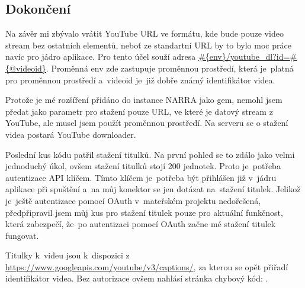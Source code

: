 \subsection{Dokončení}
\par Na závěr mi zbývalo vrátit YouTube URL ve formátu, kde bude pouze video stream bez ostatních elementů, neboť ze standartní URL by to bylo moc práce navíc pro jádro aplikace. Pro tento účel souží adresa \url{#{env}/youtube_dl?id=#{@videoid}}. Proměnná env zde zastupuje proměnnou prostředí, která je~platná pro proměnnou prostředí a~videoid je~již dobře známý identifikátor videa.
\par Protože je mé rozšíření přidáno do instance NARRA jako gem, nemohl jsem předat jako parametr pro stažení pouze URL, ve které je datový stream z YouTube, ale musel jsem použít proměnnou prostředí. Na serveru se o stažení videa postará YouTube downloader.
\par Poslední kus kódu patřil stažení titulků. Na první pohled se to zdálo jako velmi jednoduchý úkol, ovšem stažení titulků stojí 200 jednotek. Proto je~potřeba autentizace API klíčem. Tímto klíčem je~potřeba být přihlášen již v~jádru aplikace při spuštění a~na můj konektor se jen dotázat na~stažení titulek. Jelikož je~ještě autentizace pomocí OAuth v~mateřském projektu nedořešená, předpřipravil jsem můj kus pro stažení titulek pouze pro aktuální funkčnost, která zabezpečí, že~po autentizaci pomocí OAuth začne mé stažení titulek fungovat.
\par Titulky k~videu jsou k~dispozici z \url{https://www.googleapis.com/youtube/v3/captions/}, za kterou se opět přiřadí identifikátor videa. Bez autorizace ovšem nahlásí stránka chybový kód: .